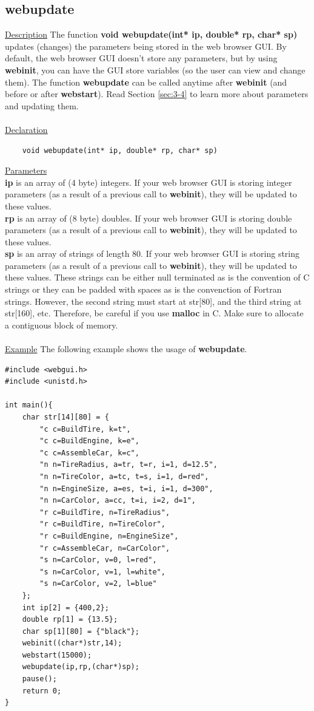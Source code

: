 \subsection{webupdate}
\underline{Description} The function \textbf{void webupdate(int* ip, double* rp, char* sp)} updates (changes)
the parameters being stored in the web browser GUI. By default, the web browser GUI doesn't store any parameters,
but by using \textbf{webinit}, you can have the GUI store variables (so the user can view and change them).
The function \textbf{webupdate} can be called anytime after \textbf{webinit} (and before or after \textbf{webstart}). Read
Section \ref{sec:3-4} to learn more about parameters and updating them.\\
\\
\underline{Declaration}
\begin{verbatim} 
	void webupdate(int* ip, double* rp, char* sp)
\end{verbatim}
\underline{Parameters}\\
\textbf{ip} is an array of (4 byte) integers. If your web browser GUI is storing integer parameters (as a result of
a previous call to \textbf{webinit}), they will be updated to these values.\\
\textbf{rp} is an array of (8 byte) doubles. If your web browser GUI is storing double parameters (as a result of
a previous call to \textbf{webinit}), they will be updated to these values.\\
\textbf{sp} is an array of strings of length 80. If your web browser GUI is storing string parameters (as a result of
a previous call to \textbf{webinit}), they will be updated to these values. These strings can be
either null terminated as is the convention of C strings or they can be padded with spaces as is the convenction
of Fortran strings. However, the second string must start at str[80], and the third string at str[160], etc. Therefore,
be careful if you use \textbf{malloc} in C. Make sure to allocate a contiguous block of memory.\\
\\
\underline{Example} The following example shows the usage of \textbf{webupdate}.
\begin{verbatim}
#include <webgui.h>
#include <unistd.h>

int main(){
    char str[14][80] = {
        "c c=BuildTire, k=t",
        "c c=BuildEngine, k=e",
        "c c=AssembleCar, k=c",
        "n n=TireRadius, a=tr, t=r, i=1, d=12.5",
        "n n=TireColor, a=tc, t=s, i=1, d=red",
        "n n=EngineSize, a=es, t=i, i=1, d=300",
        "n n=CarColor, a=cc, t=i, i=2, d=1",
        "r c=BuildTire, n=TireRadius",
        "r c=BuildTire, n=TireColor",
        "r c=BuildEngine, n=EngineSize",
        "r c=AssembleCar, n=CarColor",
        "s n=CarColor, v=0, l=red",
        "s n=CarColor, v=1, l=white",
        "s n=CarColor, v=2, l=blue"
    };
    int ip[2] = {400,2};
    double rp[1] = {13.5};
    char sp[1][80] = {"black"};
    webinit((char*)str,14);
    webstart(15000);
    webupdate(ip,rp,(char*)sp);
    pause();
    return 0;
}
\end{verbatim}
